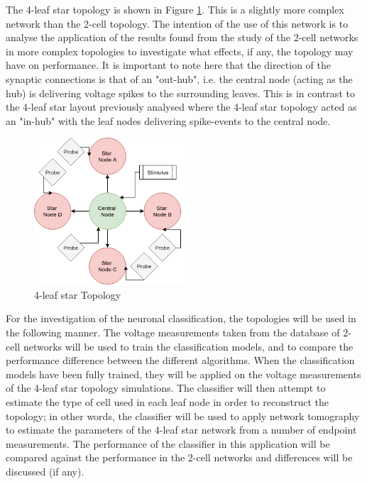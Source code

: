 The 4-leaf star topology is shown in Figure \ref{fig:4leafStar}. This is a slightly more complex network than the 2-cell topology. The intention of the use of this network is to analyse the application of the results found from the study of the 2-cell networks in more complex topologies to investigate what effects, if any, the topology may have on performance. It is important to note here that the direction of the synaptic connections is that of an "out-hub", i.e. the central node (acting as the hub) is delivering voltage spikes to the surrounding leaves. This is in contrast to the 4-leaf star layout previously analysed \cite{ekkyProj} where the 4-leaf star topology acted as an "in-hub" with the leaf nodes delivering spike-events to the central node.
\begin{figure}[ht]
    \centering
    \includegraphics[width=0.5\textwidth]{04-Methodology/4cellTop.png}
    \caption{4-leaf star Topology}
    \label{fig:4leafStar}
\end{figure}
\par

For the investigation of the neuronal classification, the topologies will be used in the following manner. The voltage measurements taken from the database of 2-cell networks will be used to train the classification models, and to compare the performance difference between the different algorithms. When the classification models have been fully trained, they will be applied on the voltage measurements of the 4-leaf star topology simulations. The classifier will then attempt to estimate the type of cell used in each leaf node in order to reconstruct the topology; in other words, the classifier will be used to apply network tomography to estimate the parameters of the 4-leaf star network from a number of endpoint measurements. The performance of the classifier in this application will be compared against the performance in the 2-cell networks and differences will be discussed (if any).
